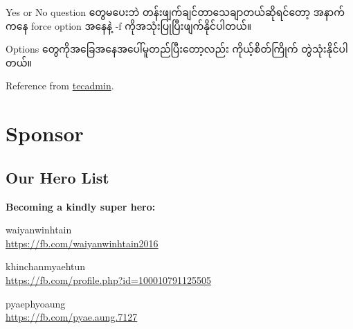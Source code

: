 Yes or No question တွေမပေးဘဲ တန်းဖျက်ချင်တာသေချာတယ်ဆိုရင်တော့ အနာက်ကနေ
force option အနေနဲ့ -f ကိုအသုံးပြုပြီးဖျက်နိုင်ပါတယ်။

\begin{Shaded}
\begin{Highlighting}[]
\NormalTok{$ }
\NormalTok{$ }
\NormalTok{$ }
\NormalTok{$ }
\NormalTok{$ }
\end{Highlighting}
\end{Shaded}

Options တွေကိုအခြေအနေအပေါ်မူတည်ပြီးတော့လည်း ကိုယ့်စိတ်ကြိုက်
တွဲသုံးနိုင်ပါတယ်။

\begin{Shaded}
\begin{Highlighting}[]
\NormalTok{$ }
\NormalTok{$ }
\NormalTok{$ }
\NormalTok{$ }
\NormalTok{$ }
\end{Highlighting}
\end{Shaded}

Reference from
\href{https://tecadmin.net/tutorial/docker/docker-prune-unused-objects/}{tecadmin}.

\pagebreak

\hypertarget{sponsor-1}{%
\section{Sponsor}\label{sponsor-1}}

\hypertarget{our-hero-list-1}{%
\subsection{Our Hero List}\label{our-hero-list-1}}

\textbf{Becoming a kindly super hero:}

waiyanwinhtain\\
\url{https://fb.com/waiyanwinhtain2016}

khinchanmyaehtun\\
\url{https://fb.com/profile.php?id=100010791125505}

pyaephyoaung\\
\url{https://fb.com/pyae.aung.7127}

